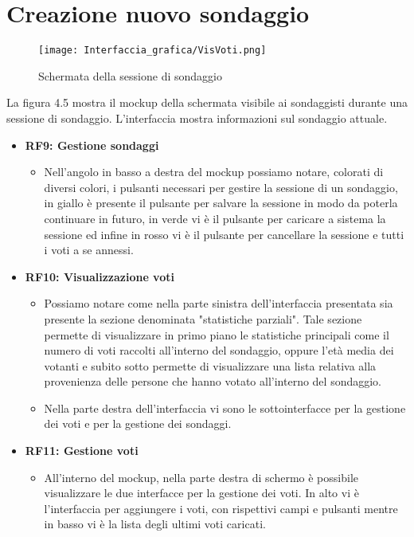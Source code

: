 \section{Creazione nuovo sondaggio}

    \begin{figure}[H]
        \center
        \texttt{[image: Interfaccia\_grafica/VisVoti.png]}
        \caption{Schermata della sessione di sondaggio}
    \end{figure}

    La figura 4.5 mostra il mockup della schermata visibile ai sondaggisti durante una sessione di sondaggio. L'interfaccia mostra informazioni sul sondaggio attuale.

    \begin{itemize}
        \item \textbf{RF9: Gestione sondaggi} \begin{itemize}
            \item Nell'angolo in basso a destra del mockup possiamo notare, colorati di diversi colori, i pulsanti necessari per gestire la sessione di un sondaggio, in giallo è presente il pulsante per salvare la sessione in modo da poterla continuare in futuro, in verde vi è il pulsante per caricare a sistema la sessione ed infine in rosso vi è il pulsante per cancellare la sessione e tutti i voti a se annessi.
        \end{itemize}
        \item \textbf{RF10: Visualizzazione voti} \begin{itemize}
            \item Possiamo notare come nella parte sinistra dell'interfaccia presentata sia presente la sezione denominata "statistiche parziali". Tale sezione permette di visualizzare in primo piano le statistiche principali come il numero di voti raccolti all'interno del sondaggio, oppure l'età media dei votanti e subito sotto permette di visualizzare una lista relativa alla provenienza delle persone che hanno votato all'interno del sondaggio.
            \item Nella parte destra dell'interfaccia vi sono le sottointerfacce per la gestione dei voti e per la gestione dei sondaggi.
        \end{itemize}
        \item \textbf{RF11: Gestione voti} \begin{itemize}
            \item All'interno del mockup, nella parte destra di schermo è possibile visualizzare le due interfacce per la gestione dei voti. In alto vi è l'interfaccia per aggiungere i voti, con rispettivi campi e pulsanti mentre in basso vi è la lista degli ultimi voti caricati.
        \end{itemize}
    \end{itemize}
    